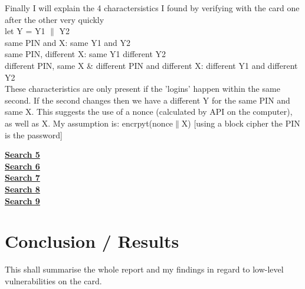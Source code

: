 \documentclass[bsc,frontabs,twoside,singlespacing,parskip,deptreport]{infthesis}     %
\begin{document}
Finally I will explain the 4 charactersistics I found by verifying with the card one after the other very quickly\\
let Y = Y1 $\|$ Y2\\
same PIN and X: same Y1 and Y2\\
same PIN, different X: same Y1 different Y2\\
different PIN, same X \& different PIN and different X: different Y1 and different Y2\\

These characteristics are only present if the 'logins' happen within the same second. If the second changes then we have a different Y for the same PIN and same X. This suggests the use of a nonce (calculated by API on the computer), as well as X. My assumption is:  encrpyt(nonce$\|$X) [using a block cipher the PIN is the password]


\textbf{\underline{Search 5}}\\
\textbf{\underline{Search 6}}\\
\textbf{\underline{Search 7}}\\
\textbf{\underline{Search 8}}\\
\textbf{\underline{Search 9}}\\




\chapter{Conclusion / Results}

This shall summarise the whole report and my findings in regard to low-level vulnerabilities on the card. 
\end{document}
